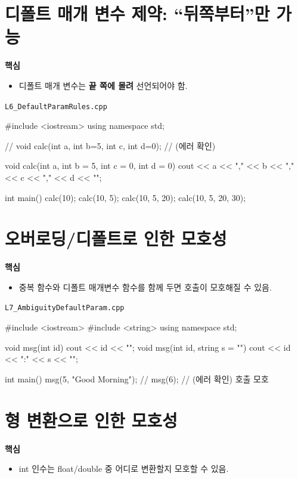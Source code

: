 \documentclass[11pt,a4paper]{article}
\newcommand{\filetag}[1]{\texttt{\color{Accent}#1}}
\begin{document}
\section{디폴트 매개 변수 제약: ``뒤쪽부터''만 가능}
\begin{GoalBox}
\textbf{핵심}
\begin{itemize}[leftmargin=18pt]
  \item 디폴트 매개 변수는 \textbf{끝 쪽에 몰려} 선언되어야 함.
\end{itemize}
\end{GoalBox}

\noindent\filetag{L6\_DefaultParamRules.cpp}
\begin{cppcode}
#include <iostream>
using namespace std;

// void calc(int a, int b=5, int c, int d=0); // (에러 확인)

void calc(int a, int b = 5, int c = 0, int d = 0) {
    cout << a << "," << b << "," << c << "," << d << "\n";
}

int main() {
    calc(10);
    calc(10, 5);
    calc(10, 5, 20);
    calc(10, 5, 20, 30);
}
\end{cppcode}

\section{오버로딩/디폴트로 인한 모호성}
\begin{GoalBox}
\textbf{핵심}
\begin{itemize}[leftmargin=18pt]
  \item 중복 함수와 디폴트 매개변수 함수를 함께 두면 호출이 모호해질 수 있음.
\end{itemize}
\end{GoalBox}

\noindent\filetag{L7\_AmbiguityDefaultParam.cpp}
\begin{cppcode}
#include <iostream>
#include <string>
using namespace std;

void msg(int id) { cout << id << "\n"; }
void msg(int id, string s = "") { cout << id << ":" << s << "\n"; }

int main() {
    msg(5, "Good Morning");
    // msg(6); // (에러 확인) 호출 모호
}
\end{cppcode}

\section{형 변환으로 인한 모호성}
\begin{GoalBox}
\textbf{핵심}
\begin{itemize}[leftmargin=18pt]
  \item int 인수는 float/double 중 어디로 변환할지 모호할 수 있음.
\end{itemize}
\end{GoalBox}
\end{document}
